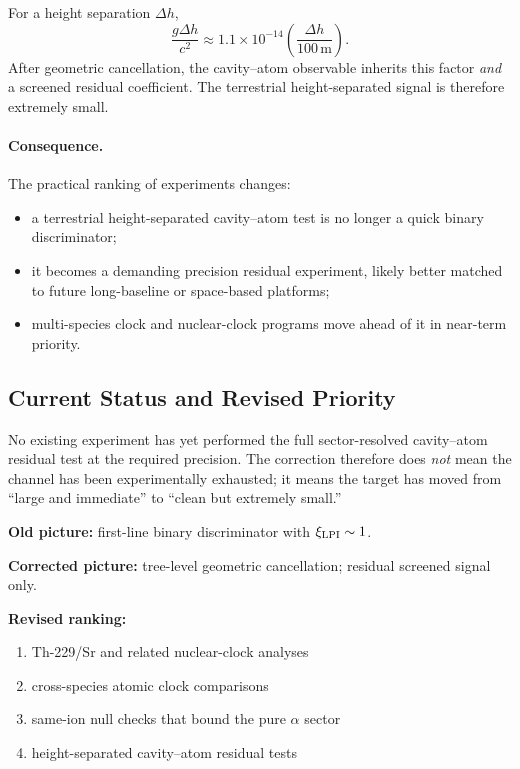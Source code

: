 For a height separation $\Delta h$,
\begin{equation}\label{eq:cavity-signal}
\frac{g\Delta h}{c^2}\approx 1.1\times10^{-14}\left(\frac{\Delta h}{100\,\mathrm{m}}\right).
\end{equation}
After geometric cancellation, the cavity--atom observable inherits this factor \emph{and} a screened residual coefficient.  The terrestrial height-separated signal is therefore extremely small.

\paragraph{Consequence.}
The practical ranking of experiments changes:
\begin{itemize}
\item a terrestrial height-separated cavity--atom test is no longer a quick binary discriminator;
\item it becomes a demanding precision residual experiment, likely better matched to future long-baseline or space-based platforms;
\item multi-species clock and nuclear-clock programs move ahead of it in near-term priority.
\end{itemize}

\subsection{Current Status and Revised Priority}\label{sec:cavity-status}

No existing experiment has yet performed the full sector-resolved cavity--atom residual test at the required precision.  The correction therefore does \emph{not} mean the channel has been experimentally exhausted; it means the target has moved from ``large and immediate'' to ``clean but extremely small.''

\begin{tcolorbox}[colback=blue!5!white,colframe=blue!60!black,title=Revised Cavity--Atom Priority]
\textbf{Old picture:} first-line binary discriminator with $\xi_{\rm LPI}\sim1$.

\textbf{Corrected picture:} tree-level geometric cancellation; residual screened signal only.

\textbf{Revised ranking:}
\begin{enumerate}
\item Th-229/Sr and related nuclear-clock analyses
\item cross-species atomic clock comparisons
\item same-ion null checks that bound the pure $\alpha$ sector
\item height-separated cavity--atom residual tests
\end{enumerate}
\end{tcolorbox}

